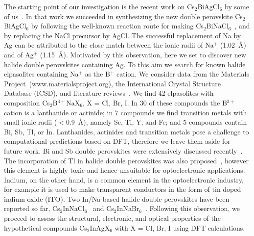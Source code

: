 \documentclass[journal=jpcl,manuscript=letter,layout=traditional]{achemso}
\begin{document}
The starting point of our investigation is the recent work on Cs$_2$BiAgCl$_6$ by some of us~\cite{Volonakis2016}.
In that work we succeeded in synthesizing the new double perovskite
Cs$_2$BiAgCl$_6$ by following the well-known reaction route for making Cs$_2$BiNaCl$_6$~\cite{Morss1972},
and by replacing the NaCl precursor by AgCl. The successful replacement of Na by Ag can be attributed
to the close match between the ionic radii of Na$^{+}$ (1.02~\AA) and of Ag$^{+}$ (1.15~\AA).
Motivated by this observation, here we set to discover new halide double perovskites containing
Ag. To this aim we search for known halide elpasolites containing Na$^{+}$ as the B$^{+}$ cation.
We consider data from the Materials Project~(www.materialsproject.org), the International Crystal
Structure Database (ICSD), and literature reviews~\cite{Morss1970,
Morss1972,Meyer1978,Meyer1980}. We find 42
elpasolites with composition Cs$_2$B$^{3+}$NaX$_6$, X = Cl, Br, I. In 30 of these compounds
the B$^{3+}$ cation is a lanthanide or actinide; in 7 compounds we find transition metals
with small ionic radii ($<$0.9~\AA), namely Sc, Ti, Y, and Fe; and 5 compounds
contain Bi, Sb, Tl, or In. Lanthanides, actinides and transition metals pose a challenge to computational
predictions based on DFT, therefore we leave them aside for future
work. Bi and Sb double perovskites were extensively discussed recently~\cite{Volonakis2016}.
The incorporation of Tl in halide double perovskites was also proposed~\cite{Giorgi2015},
however this element is highly toxic and hence unsuitable for optoelectronic applications.
Indium, on the other hand, is a common element in the optoelectronic industry, for example
it is used to make transparent conductors in the form of tin doped indium oxide (ITO).
Two In/Na-based halide double perovskites have been reported so far, Cs$_2$InNaCl$_6$~\cite{Morss1970,
Meyer1978} and Cs$_2$InNaBr$_6$~\cite{Meyer1978}. Following this observation, we proceed to
assess the structural, electronic, and optical properties of the hypothetical compounds
Cs$_2$InAgX$_6$ with X = Cl, Br, I using DFT calculations.
\end{document}
